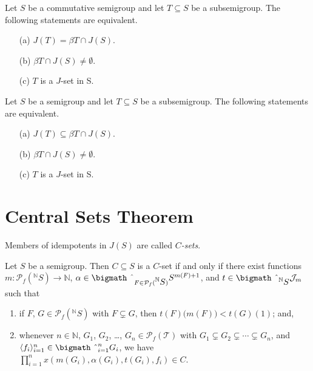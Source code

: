 \documentclass{beamer}
\newcommand{\la}{\langle}
\newcommand{\ra}{\rangle}
\newcommand{\bbN}{\mathbb{N}}
\newcommand{\calJ}{\mathcal{J}}
\newcommand{\calT}{\mathcal{T}}
\newcommand{\Pf}{\mathcal{P}_f}
\newcommand{\bigtimes}{\hbox{\bigmath \char'2}}
\begin{document}
\begin{frame}
  \begin{theorem}
    Let $S$ be a commutative semigroup and let $T \subseteq S$ be a subsemigroup. 
    The following statements are equivalent.
    \begin{itemize}
      \item[(a)] $J(T) = \beta T \cap J(S)$.
      \item[(b)] $\beta T \cap J(S) \ne \emptyset$.
      \item[(c)] $T$ is a $J$-set in S.
    \end{itemize}
  \end{theorem}

  \pause

  \begin{theorem}
    Let $S$ be a semigroup and let $T \subseteq S$ be a subsemigroup. 
    The following statements are equivalent.
    \begin{itemize}
      \item[(a)] \alert{$J(T) \subseteq \beta T \cap J(S)$.}
      \item[(b)] $\beta T \cap J(S) \ne \emptyset$.
      \item[(c)] $T$ is a $J$-set in S.
    \end{itemize}
  \end{theorem}
\end{frame}

\section{Central Sets Theorem}
\begin{frame}
  \begin{definition}
    Members of idempotents in $J(S)$ are called \textsl{$C$-sets}.
  \end{definition}
  
  \pause

  \begin{theorem}
    Let $S$ be a semigroup.
    Then $C \subseteq S$ is a $C$-set if and only if there exist
    functions $m \colon \Pf(\mbox{$^{\bbN}{S}$}) \to \bbN$, $\alpha
    \in \bigtimes_{F \in \Pf(\mbox{$^{\bbN}{S}$})} S^{m(F) + 1}$, and
    $t \in \bigtimes_{\mbox{$^{\bbN}{S}$}} \calJ_m$ such that 
    \pause
    \begin{enumerate}
      \item if $F$, $G \in \Pf(\mbox{$^{\bbN}{S}$})$ with $F \subsetneq
        G$, then $t(F)\bigl( m(F) \bigr) < t(G)(1)$; and,
        \pause
      
      \item whenever $n \in \bbN$, $G_1$, $G_2$, \ldots, $G_n
          \in \Pf(\calT)$ with $G_1 \subsetneq G_2 \subsetneq \cdots
          \subsetneq G_n$, and $\la f_i \ra_{i=1}^n \in
          \bigtimes_{i=1}^n G_i$, we have
          $\prod_{i=1}^n x(m(G_i), \alpha(G_i), t(G_i), f_i) \in C$. 
    \end{enumerate}
  \end{theorem}
\end{frame}
\end{document}
